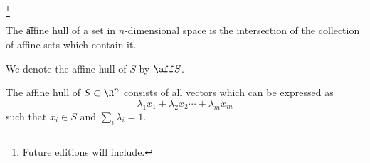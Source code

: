 
  \ifhmode\unskip\fi\footnote{
Future editions will include.
  }


The \t{affine hull} of a set in $n$-dimensional space is the intersection of the collection of affine sets which contain it.


We denote the affine hull of $S$ by $\aff S$.

\begin{prop}
The affine hull of $S \subset \R^n$ consists of all vectors which can be expressed as
  \[
\lambda_1 x_1 + \lambda_2 x_2 \cdots + \lambda_m x_m
  \]
such that $x_i \in S$ and $\sum_i \lambda_i = 1$.
\end{prop}

\blankpage

